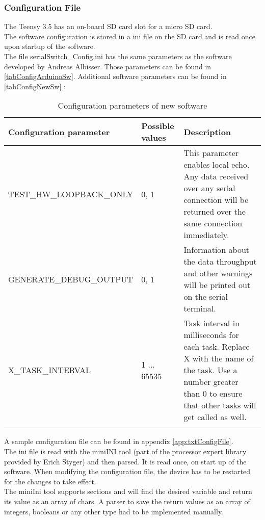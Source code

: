 \subsubsection{Configuration File}
The Teensy 3.5 has an on-board SD card slot for a micro SD card.\\
The software configuration is stored in a ini file on the SD card and is read once upon startup of the software.\\
The file serialSwitch\_Config.ini has the same parameters as the software developed by Andreas Albisser. Those parameters can be found in \autoref{tabConfigArduinoSw}. Additional software parameters can be found in \autoref{tabConfigNewSw} :\\
\begin{center}
    \begin{longtable}{p{6cm}p{1cm}p{7cm}}
        \hline
        \textbf{Configuration parameter} & \textbf{Possible values} & \textbf{Description} \\
        \hline
        TEST\_HW\_LOOPBACK\_ONLY & 0, 1 & 
        This parameter enables local echo. Any data received over any serial connection will be returned over the same connection immediately.\\
        \hline
        GENERATE\_DEBUG\_OUTPUT &  0, 1 & 
        Information about the data throughput and other warnings will be printed out on the serial terminal.\\
        \hline
        X\_TASK\_INTERVAL &  1 ... 65535 & 
        Task interval in milliseconds for each task. Replace X with the name of the task. Use a number greater than 0 to ensure that other tasks will get called as well. \\
        \hline
        \caption{Configuration parameters of new software}
        \label{tab:tabConfigNewSw}    
    \end{longtable}
\end{center}
A sample configuration file can be found in appendix \autoref{app:txtConfigFile}.\\
The ini file is read with the miniINI tool (part of the processor expert library provided by Erich Styger) and then parsed. It is read once, on start up of the software. When modifying the configuration file, the device has to be restarted for the changes to take effect.\\
The miniIni tool supports sections and will find the desired variable and return its value as an array of chars. A parser to save the return values as an array of integers, booleans or any other type had to be implemented manually.
%
